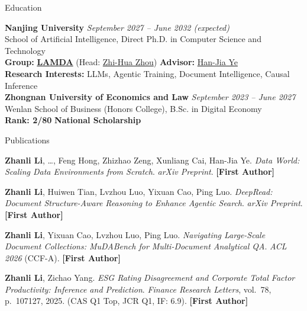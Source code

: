 \documentclass{resume}
\begin{document}



\begin{rSection}{Education}

{\bf Nanjing University} \hfill {\em September 2027 -- June 2032 (expected)} \\
School of Artificial Intelligence, Direct Ph.D. in Computer Science and Technology \\
\textbf{Group:} \href{https://www.lamda.nju.edu.cn}{\bf \textcolor{lamdaorange}{L}\textcolor{lamdapurple}{A}\textcolor{lamdaorange}{M}\textcolor{lamdapurple}{DA}} (Head: \href{https://cs.nju.edu.cn/zhouzh/}{Zhi-Hua Zhou}) \quad \textbf{Advisor:} \href{https://www.lamda.nju.edu.cn/yehj/}{Han-Jia Ye} \\
\textbf{Research Interests:} LLMs, Agentic Training, Document Intelligence, Causal Inference \\[3pt]
{\bf Zhongnan University of Economics and Law} \hfill {\em September 2023 -- June 2027} \\
Wenlan School of Business (Honors College), B.Sc. in Digital Economy \\
\textbf{Rank: 2/80} \quad \textbf{National Scholarship}

\end{rSection}


\begin{rSection}{Publications}

\textbf{Zhanli Li}, \ldots, Feng Hong, Zhizhao Zeng, Xunliang Cai, Han-Jia Ye. \textit{Data World: Scaling Data Environments from Scratch}. \textit{arXiv Preprint}. \textbf{[First Author]}

\textbf{Zhanli Li}, Huiwen Tian, Lvzhou Luo, Yixuan Cao, Ping Luo. \textit{DeepRead: Document Structure-Aware Reasoning to Enhance Agentic Search}. \textit{arXiv Preprint}. \textbf{[First Author]}

\textbf{Zhanli Li}, Yixuan Cao, Lvzhou Luo, Ping Luo. \textit{Navigating Large-Scale Document Collections: MuDABench for Multi-Document Analytical QA}. \textit{ACL 2026} (CCF-A). \textbf{[First Author]}

\textbf{Zhanli Li}, Zichao Yang. \textit{ESG Rating Disagreement and Corporate Total Factor Productivity: Inference and Prediction}. \textit{Finance Research Letters}, vol.~78, p.~107127, 2025. (CAS Q1 Top, JCR Q1, IF: 6.9). \textbf{[First Author]}

\end{rSection}
\end{document}
